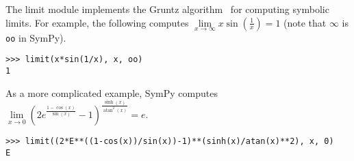 The limit module implements the Gruntz algorithm~\cite{Gruntz1996limits} for
computing symbolic limits. For example, the following computes
$\lim\limits_{x\to \infty} x\sin(\frac{1}{x})=1$ (note that $\infty$ is
\verb|oo| in SymPy).
\begin{verbatim}
>>> limit(x*sin(1/x), x, oo)
1
\end{verbatim}
As a more complicated example, SymPy computes $\lim\limits_{x\to 0}{\left(2 e^{\frac{1 - \cos{\left (x \right )}}{\sin{\left (x \right )}}} -
  1\right)}^{\frac{\sinh{\left (x \right )}}{\operatorname{atan}^{2}{\left (x
      \right )}}} = e$.
\begin{verbatim}
>>> limit((2*E**((1-cos(x))/sin(x))-1)**(sinh(x)/atan(x)**2), x, 0)
E
\end{verbatim}
